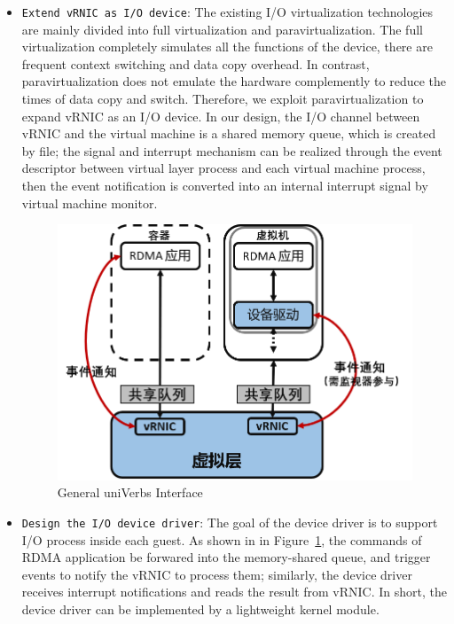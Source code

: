 \begin{itemize}
\item {\verb|Extend vRNIC as I/O device|}: 
The existing I/O virtualization technologies are mainly divided into full virtualization and paravirtualization. The full virtualization completely simulates all the functions of the device, there are frequent context switching and data copy overhead. 
In contrast, paravirtualization does not emulate the hardware complemently to reduce the times of data copy and switch. Therefore, we exploit paravirtualization to expand vRNIC as an I/O device. In our design, the I/O channel between vRNIC and the virtual machine is a shared memory queue, which is created by file; the signal and interrupt mechanism can be realized through the event descriptor between virtual layer process and each virtual machine process, then the event notification is converted into an internal interrupt signal by virtual machine monitor.
 
\begin{figure}[!ht]
	\centering
	\includegraphics[width=1.0\linewidth]{images/interface-general}
	\caption{General uniVerbs Interface}
	\label{fig:interface-general}
\end{figure}


\item {\verb|Design the I/O device driver|}:
The goal of the device driver is to support I/O process inside each guest. As shown in in Figure~\ref{fig:interface-general},  the commands of RDMA application be forwared into the memory-shared queue, and trigger events to notify the vRNIC to process them; similarly, the device driver receives interrupt notifications and reads the result from vRNIC. In short, the device driver can be implemented by a lightweight kernel module.

\end{itemize}


